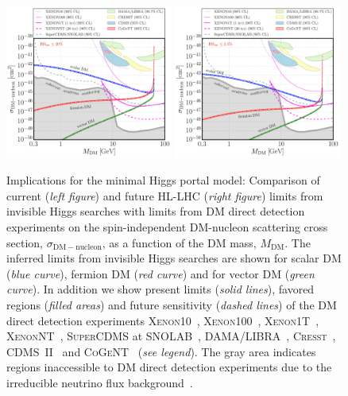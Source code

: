 \documentclass[../report.tex]{subfiles}
\newcommand{\MDM}{M_\mathrm{DM}}
\begin{document}
\begin{figure}
\centering
\includegraphics[width=0.49\textwidth]{section6/DM-SI-XS_HiggsPortalDM_BRinv_0p2_HoferichterF}
\hfill
\includegraphics[width=0.49\textwidth]{section6/DM-SI-XS_HiggsPortalDM_BRinv_0p025_HoferichterF}
\caption{\label{fig:mini} Implications for the minimal Higgs portal model: Comparison of current (\emph{left figure}) and future HL-LHC (\emph{right figure}) limits from invisible Higgs searches  with limits from DM direct detection experiments on the spin-independent DM-nucleon scattering cross section, $\sigma_{\mathrm{DM}-\mathrm{nucleon}}$, as a function of the DM mass, $\MDM$. The inferred limits from invisible Higgs searches are shown for scalar DM (\emph{blue curve}), fermion DM (\emph{red  curve}) and for vector DM (\emph{green  curve}). In addition we show present limits (\emph{solid lines}), favored regions (\emph{filled areas}) and future sensitivity (\emph{dashed lines}) of the DM direct detection experiments \textsc{Xenon10}~\cite{Angle:2011th}, \textsc{Xenon100}~\cite{Aprile:2012nq}, \textsc{Xenon1T}~\cite{Aprile:2018dbl}, \textsc{XenonNT}~\cite{Aprile:2015uzo}, \textsc{SuperCDMS} at SNOLAB~\cite{Agnese:2016cpb}, \textsc{DAMA/LIBRA}~\cite{Savage:2008er}, \textsc{Cresst}~\cite{Angloher:2011uu}, \textsc{CDMS~II}~\cite{Agnese:2013rvf} and \textsc{CoGeNT}~\cite{Aalseth:2012if} (\emph{see legend}). The gray area indicates regions inaccessible to DM direct detection experiments due to the irreducible neutrino flux background~\cite{Billard:2013qya}.}
\label{fig:minimalHP}
\end{figure}
\end{document}
